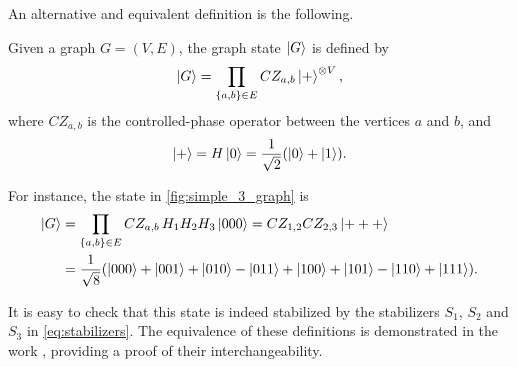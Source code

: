 An alternative and equivalent definition is the following.

Given a graph $G = (V, E)$, the graph state $\ket{G}$ is defined by
\begin{equation}
    \ket{G} = \prod_{\substack{\{ a, b \} \in E}} 
    CZ_{a, b} \ket{+}^{\otimes V} ,
\end{equation}
where $CZ_{a, b}$ is the controlled-phase operator between the vertices $a$ and $b$, and 
\begin{equation}
    \ket{+} = H \ket{0} = \frac{1}{\sqrt{2}} (\ket{0} + \ket{1}) .
\end{equation}

For instance, the state in \cref{fig:simple_3_graph} is
\begin{align}
    \ket{G} &=
    \prod_{\substack{\{ a, b \} \in E}} CZ_{a,b} \, H_1 H_2 H_3 \ket{000} =
    CZ_{1, 2} CZ_{2, 3} \ket{+++} \\
    &= \frac{1}{\sqrt{8}} 
    (\ket{000} + \ket{001} + \ket{010} - \ket{011} 
    + \ket{100} + \ket{101} - \ket{110} + \ket{111}) . \notag
\end{align}

It is easy to check that this state is indeed stabilized by the stabilizers $S_1$, $S_2$ and $S_3$ in \cref{eq:stabilizers}.
The equivalence of these definitions is demonstrated in the work \cite{graph_state}, providing a proof of their interchangeability.
